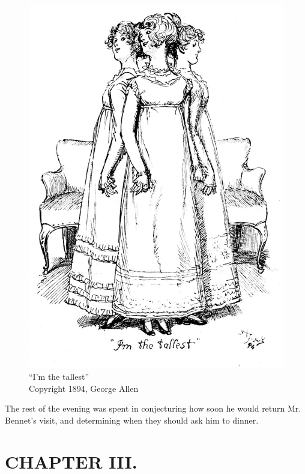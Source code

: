 \begin{figure}[htbp]
    \centering
    \includegraphics[width=\textwidth]{illustrations/i_038.jpg}
    \caption{“I'm the tallest”\\ Copyright 1894, George Allen}
    \label{fig:image}
\end{figure}

The rest of the evening was spent in conjecturing how soon he would return Mr. Bennet's visit, and determining when they should ask him to dinner.

\chapter{CHAPTER III.}

